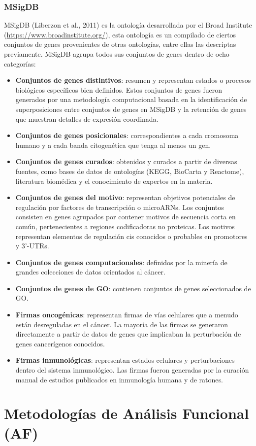 \documentclass[12pt,twoside]{reedthesis}
\providecommand{\tightlist}{%
  \setlength{\itemsep}{0pt}\setlength{\parskip}{0pt}}
\begin{document}
\hypertarget{msigdb}{%
\subsubsection{MSigDB}\label{msigdb}}

MSigDB (Liberzon et al., 2011) es la ontología desarrollada por el Broad Institute (\url{https://www.broadinstitute.org/}), esta ontología es un compilado de ciertos conjuntos de genes provenientes de otras ontologías, entre ellas las descriptas previamente. MSigDB agrupa todos sus conjuntos de genes dentro de ocho categorías:
\begin{itemize}
\tightlist
\item
  \textbf{Conjuntos de genes distintivos}: resumen y representan estados o procesos biológicos específicos bien definidos. Estos conjuntos de genes fueron generados por una metodología computacional basada en la identificación de superposiciones entre conjuntos de genes en MSigDB y la retención de genes que muestran detalles de expresión coordinada.
\item
  \textbf{Conjuntos de genes posicionales}: correspondientes a cada cromosoma humano y a cada banda citogenética que tenga al menos un gen.
\item
  \textbf{Conjuntos de genes curados}: obtenidos y curados a partir de diversas fuentes, como bases de datos de ontologías (KEGG, BioCarta y Reactome), literatura biomédica y el conocimiento de expertos en la materia.
\item
  \textbf{Conjuntos de genes del motivo}: representan objetivos potenciales de regulación por factores de transcripción o microARNs. Los conjuntos consisten en genes agrupados por contener motivos de secuencia corta en común, pertenecientes a regiones codificadoras no proteicas. Los motivos representan elementos de regulación cis conocidos o probables en promotores y 3'-UTRs.
\item
  \textbf{Conjuntos de genes computacionales}: definidos por la minería de grandes colecciones de datos orientados al cáncer.
\item
  \textbf{Conjuntos de genes de GO}: contienen conjuntos de genes seleccionados de GO.
\item
  \textbf{Firmas oncogénicas}: representan firmas de vías celulares que a menudo están desreguladas en el cáncer. La mayoría de las firmas se generaron directamente a partir de datos de genes que implicaban la perturbación de genes cancerígenos conocidos.
\item
  \textbf{Firmas inmunológicas}: representan estados celulares y perturbaciones dentro del sistema inmunológico. Las firmas fueron generadas por la curación manual de estudios publicados en inmunología humana y de ratones.
\end{itemize}
\hypertarget{sec:af}{%
\section{Metodologías de Análisis Funcional (AF)}\label{sec:af}}
\end{document}

